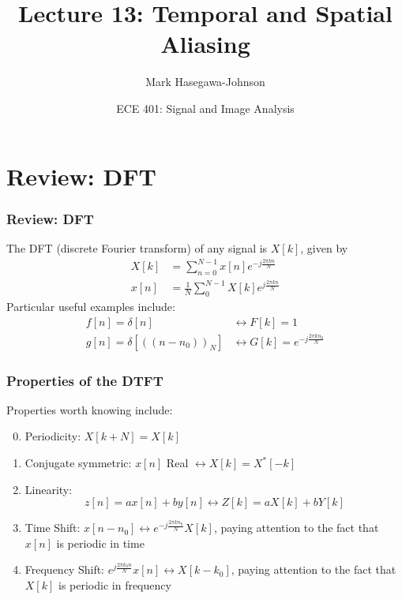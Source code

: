 \documentclass{beamer}
\title{Lecture 13: Temporal and Spatial Aliasing}
\author{Mark Hasegawa-Johnson}
\date{ECE 401: Signal and Image Analysis}
\begin{document}
\begin{frame}
  \maketitle
\end{frame}

\begin{frame}
  \tableofcontents
\end{frame}

\section[Review]{Review: DFT}
\setcounter{subsection}{1}

\begin{frame}
  \frametitle{Review: DFT}

  The DFT (discrete Fourier transform) of any signal is
  $X[k]$, given by
  \begin{align*}
    X[k] &= \sum_{n=0}^{N-1} x[n]e^{-j\frac{2\pi kn}{N}}\\
    x[n] &= \frac{1}{N}\sum_0^{N-1} X[k]e^{j\frac{2\pi kn}{N}}
  \end{align*}
  Particular useful examples include:
  \begin{align*}
    f[n]=\delta[n] &\leftrightarrow F[k]=1\\
    g[n]=\delta\left[(\!(n-n_0)\!)_N\right] &\leftrightarrow G[k]=e^{-j\frac{2\pi kn_0}{N}}
  \end{align*}
\end{frame}

\begin{frame}
  \frametitle{Properties of the DTFT}

  Properties worth knowing  include:
  \begin{enumerate}
    \setcounter{enumi}{-1}
  \item Periodicity: $X[k+N]=X[k]$
  \item Conjugate symmetric: $x[n]$ Real $\leftrightarrow X[k]=X^*[-k]$
  \item Linearity:
    \[z[n]=ax[n]+by[n]\leftrightarrow Z[k]=aX[k]+bY[k]
    \]
  \item Time Shift: $x[n-n_0]\leftrightarrow e^{-j\frac{2\pi
      kn_0}{N}}X[k]$, paying attention to the fact that $x[n]$ is
    periodic in time
  \item Frequency Shift: $e^{j\frac{2\pi k_0 n}{N}}x[n]\leftrightarrow
    X[k-k_0]$, paying attention to the fact that $X[k]$ is periodic
    in frequency
  \end{enumerate}
\end{frame}
\end{document}
